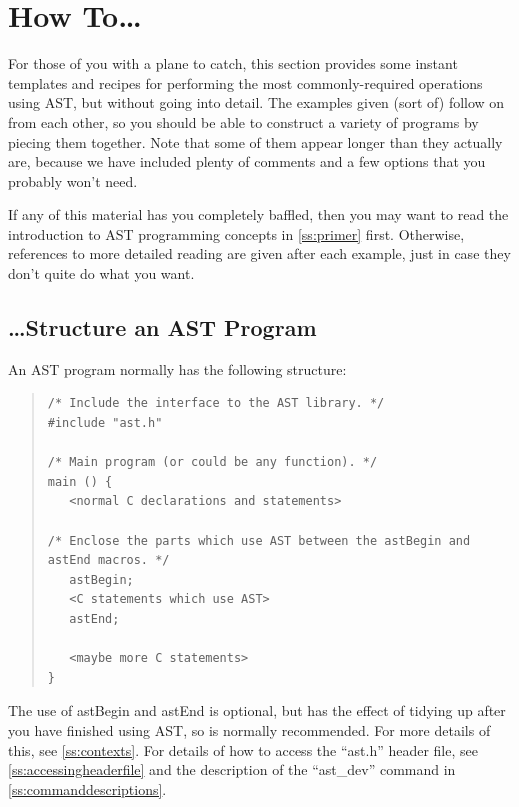 \documentclass[twoside,11pt]{article}
\newcommand{\htmlref}[2]{#1}
\newcommand{\appref}[1]{Appendix~\ref{#1}}
\newcommand{\secref}[1]{\S\ref{#1}}
\renewcommand{\appref}[1]{\ref{#1}}
\renewcommand{\secref}[1]{\ref{#1}}
\begin{document}
\cleardoublepage
%
\section{\label{ss:howto}How To\ldots}

For those of you with a plane to catch, this section provides some
instant templates and recipes for performing the most
commonly-required operations using AST, but without going into
detail. The examples given (sort of) follow on from each other, so you
should be able to construct a variety of programs by piecing them
together.  Note that some of them appear longer than they actually
are, because we have included plenty of comments and a few options
that you probably won't need.

If any of this material has you completely baffled, then you may want
to read the introduction to AST programming concepts in
\secref{ss:primer} first. Otherwise, references to more detailed
reading are given after each example, just in case they don't quite do
what you want.

\subsection{\ldots Structure an AST Program}

An AST program normally has the following structure:

\begin{quote}
\small
\begin{verbatim}
/* Include the interface to the AST library. */
#include "ast.h"

/* Main program (or could be any function). */
main () {
   <normal C declarations and statements>

/* Enclose the parts which use AST between the astBegin and astEnd macros. */
   astBegin;
   <C statements which use AST>
   astEnd;

   <maybe more C statements>
}
\end{verbatim}
\normalsize
\end{quote}

The use of \htmlref{astBegin}{astBegin} and \htmlref{astEnd}{astEnd} is optional, but has the effect of
tidying up after you have finished using AST, so is normally
recommended. For more details of this, see \secref{ss:contexts}. For
details of how to access the ``ast.h'' header file, see
\secref{ss:accessingheaderfile} and the description of the
``\htmlref{ast\_dev}{ast_dev}'' command in \appref{ss:commanddescriptions}.
\end{document}
